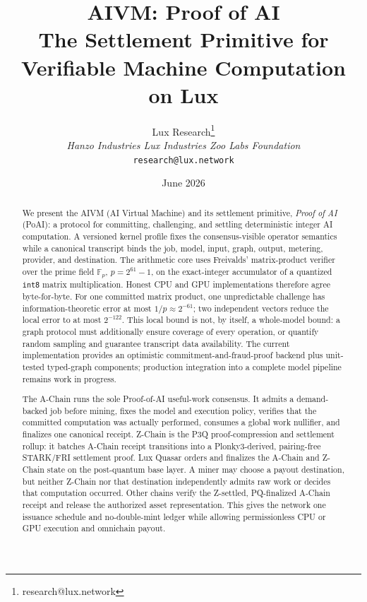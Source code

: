 \documentclass[11pt,a4paper]{article}
\title{AIVM: Proof of AI\\
\large The Settlement Primitive for Verifiable Machine Computation on Lux}
\author{Lux Research\thanks{research@lux.network} \\ \textit{Hanzo Industries \quad Lux Industries \quad Zoo Labs Foundation} \\ \texttt{research@lux.network}}
\date{June 2026}
\begin{document}
\maketitle

\begin{abstract}
We present the AIVM (AI Virtual Machine) and its settlement primitive, \emph{Proof of AI} (PoAI): a protocol for committing, challenging, and settling deterministic integer AI computation. A versioned kernel profile fixes the consensus-visible operator semantics while a canonical transcript binds the job, model, input, graph, output, metering, provider, and destination. The arithmetic core uses Freivalds' matrix-product verifier over the prime field $\mathbb{F}_p$, $p = 2^{61}-1$, on the exact-integer accumulator of a quantized \texttt{int8} matrix multiplication. Honest CPU and GPU implementations therefore agree byte-for-byte. For one committed matrix product, one unpredictable challenge has information-theoretic error at most $1/p \approx 2^{-61}$; two independent vectors reduce the local error to at most $2^{-122}$. This local bound is not, by itself, a whole-model bound: a graph protocol must additionally ensure coverage of every operation, or quantify random sampling and guarantee transcript data availability. The current implementation provides an optimistic commitment-and-fraud-proof backend plus unit-tested typed-graph components; production integration into a complete model pipeline remains work in progress.

The A-Chain runs the sole Proof-of-AI useful-work consensus. It admits a demand-backed job before mining, fixes the model and execution policy, verifies that the committed computation was actually performed, consumes a global work nullifier, and finalizes one canonical receipt. Z-Chain is the P3Q proof-compression and settlement rollup: it batches A-Chain receipt transitions into a Plonky3-derived, pairing-free STARK/FRI settlement proof. Lux Quasar orders and finalizes the A-Chain and Z-Chain state on the post-quantum base layer. A miner may choose a payout destination, but neither Z-Chain nor that destination independently admits raw work or decides that computation occurred. Other chains verify the Z-settled, PQ-finalized A-Chain receipt and release the authorized asset representation. This gives the network one issuance schedule and no-double-mint ledger while allowing permissionless CPU or GPU execution and omnichain payout.
\end{abstract}

\tableofcontents
\end{document}
